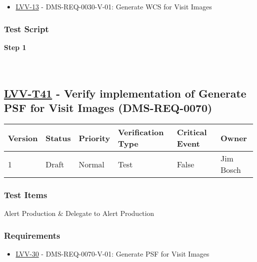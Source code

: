 \begin{itemize}
\tightlist
\item
  \href{https://jira.lsstcorp.org/browse/LVV-13}{LVV-13} -
  DMS-REQ-0030-V-01: Generate WCS for Visit Images
\end{itemize}

\hypertarget{test-script-17}{%
\subsubsection{Test Script}\label{test-script-17}}

\textbf{Step 1}\\
~\\
~\\

\hypertarget{lvv-t41---verify-implementation-of-generate-psf-for-visit-images-dms-req-0070}{%
\subsection{\texorpdfstring{\href{https://jira.lsstcorp.org/secure/Tests.jspa\#/testCase/LVV-T41}{LVV-T41}
- Verify implementation of Generate PSF for Visit Images
(DMS-REQ-0070)}{LVV-T41 - Verify implementation of Generate PSF for Visit Images (DMS-REQ-0070)}}\label{lvv-t41---verify-implementation-of-generate-psf-for-visit-images-dms-req-0070}}

\begin{longtable}[]{@{}llllll@{}}
\toprule
Version & Status & Priority & Verification Type & Critical Event &
Owner\tabularnewline
\midrule
\endhead
1 & Draft & Normal & Test & False & Jim Bosch\tabularnewline
\bottomrule
\end{longtable}

\hypertarget{test-items-17}{%
\subsubsection{Test Items}\label{test-items-17}}

Alert Production \& Delegate to Alert Production

\hypertarget{requirements-18}{%
\subsubsection{Requirements}\label{requirements-18}}

\begin{itemize}
\tightlist
\item
  \href{https://jira.lsstcorp.org/browse/LVV-30}{LVV-30} -
  DMS-REQ-0070-V-01: Generate PSF for Visit Images
\end{itemize}


